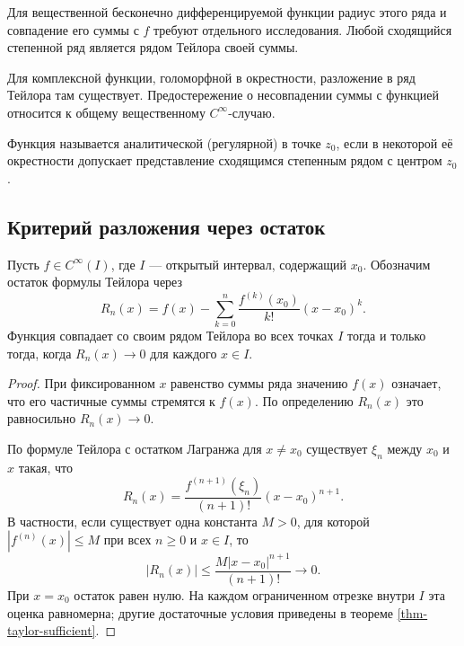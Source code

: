 Для вещественной бесконечно дифференцируемой функции радиус этого ряда и совпадение его суммы с \(f\) требуют отдельного исследования. Любой сходящийся степенной ряд является рядом Тейлора своей суммы.

Для комплексной функции, голоморфной в окрестности, разложение в ряд Тейлора там существует. Предостережение о несовпадении суммы с функцией относится к общему вещественному \(C^\infty\)-случаю.

\begin{definition}[Аналитичность]\label{def-analytic}

Функция называется аналитической (регулярной) в точке \(z_0\), если в некоторой её окрестности допускает представление сходящимся степенным рядом с центром \(z_0\).

\end{definition}

\subsection{Критерий разложения через остаток}\label{sec-taylor-remainder}

\begin{cor}\label{cor-taylor-remainder}

Пусть \(f\in C^\infty(I)\), где \(I\) --- открытый интервал, содержащий \(x_0\). Обозначим остаток формулы Тейлора через
\[
R_n(x)=f(x)-\sum_{k=0}^n\frac{f^{(k)}(x_0)}{k!}(x-x_0)^k.
\]
Функция совпадает со своим рядом Тейлора во всех точках \(I\) тогда и только тогда, когда \(R_n(x)\to0\) для каждого \(x\in I\).

\end{cor}

\begin{proof}

При фиксированном \(x\) равенство суммы ряда значению \(f(x)\) означает, что его частичные суммы стремятся к \(f(x)\). По определению \(R_n(x)\) это равносильно \(R_n(x)\to0\).

По формуле Тейлора с остатком Лагранжа для \(x\ne x_0\) существует \(\xi_n\) между \(x_0\) и \(x\) такая, что
\[
R_n(x)=\frac{f^{(n+1)}(\xi_n)}{(n+1)!}(x-x_0)^{n+1}.
\]
В частности, если существует одна константа \(M>0\), для которой \(|f^{(n)}(x)|\le M\) при всех \(n\ge0\) и \(x\in I\), то
\[
|R_n(x)|\le\frac{M|x-x_0|^{n+1}}{(n+1)!}\longrightarrow0.
\]
При \(x=x_0\) остаток равен нулю. На каждом ограниченном отрезке внутри \(I\) эта оценка равномерна; другие достаточные условия приведены в теореме \ref{thm-taylor-sufficient}.

\end{proof}

